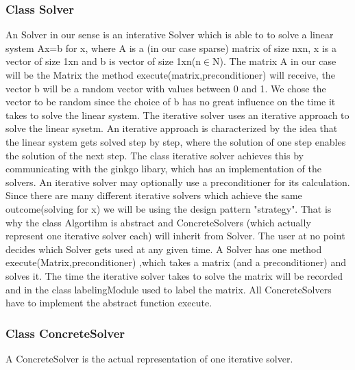 \documentclass[parskip=full]{scrartcl}
\begin{document}
\subsubsection{Class Solver}
An Solver in our sense is an interative Solver which is able to to solve a linear system Ax=b for x, where A is a (in our case sparse) matrix of size nxn, x is a vector of size 1xn and b is vector of size 1xn(n$\in$N).
The matrix A in our case will be the Matrix the method execute(matrix,preconditioner) will receive, the vector b will be a random vector with values between 0 and 1.
We chose the vector to be random since the choice of b has no great influence on the time it takes to solve the linear system.
The \gls{iterative solver} uses an iterative approach to solve the linear sysetm.
An iterative approach is characterized by the idea that the linear system gets solved step by step, where the solution of one step enables the solution of the next step.
The class \gls{iterative solver} achieves this by communicating with the ginkgo libary, which has an implementation of the solvers.
An \gls{iterative solver} may optionally use a \gls{preconditioner} for its calculation.
Since there are many different \gls{iterative solver}s which achieve the same outcome(solving for x) we will be using the design pattern "\gls{strategy}".
That is why the class Algortihm is abstract and ConcreteSolvers (which actually represent one \gls{iterative solver} each) will inherit from Solver.
The user at no point decides which Solver gets used at any given time. \newline
A Solver has one method execute(Matrix,\gls{preconditioner}) ,which takes a matrix (and a \gls{preconditioner}) and solves it.
The time the \gls{iterative solver} takes to solve the matrix will be recorded and in the class labelingModule used to label the matrix.
All ConcreteSolvers have to implement the abstract function execute.

\subsubsection{Class ConcreteSolver}
A ConcreteSolver is the actual representation of one \gls{iterative solver}.
\end{document}

